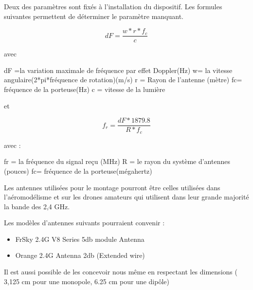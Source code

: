 Deux des paramètres sont fixés à l'installation du dispositif. Les formules suivantes permettent de déterminer le paramètre manquant.

\begin{equation}
dF = \frac{w*r*f_c}{c}
\end{equation}

avec 

dF =la variation maximale de fréquence par effet Doppler(Hz)
w= la vitesse angulaire(2*pi*fréquence de rotation)(m/s)
r = Rayon de l'antenne (mètre)
fc= fréquence de la porteuse(Hz)
c = vitesse de la lumière

et

\begin{equation}
f_r = \frac{dF*1879.8}{R*f_c}
\end{equation}

avec :

fr = la fréquence du signal reçu (MHz)
R = le rayon du système d'antennes (pouces)
fc= fréquence de la porteuse(mégahertz)


Les antennes utilisées pour le montage pourront être celles utilisées dans l'aéromodélisme et sur les drones amateurs qui utilisent dans leur grande majorité la bande des 2,4 GHz.

Les modèles d'antennes suivants pourraient convenir :

\begin{itemize}

\item FrSky 2.4G V8 Series 5db module Antenna

\item Orange 2.4G Antenna 2db (Extended wire)

\end{itemize}

Il est aussi possible de les concevoir nous même en respectant les dimensions ( 3,125 cm pour une monopole, 6.25 cm pour une dipôle)

